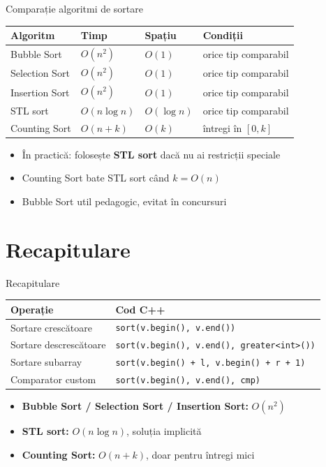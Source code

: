 \documentclass{beamer}
\begin{document}
\begin{frame}{Comparație algoritmi de sortare}
  \begin{center}
  \begin{tabular}{llll}
    \toprule
    Algoritm & Timp & Spațiu & Condiții \\
    \midrule
    Bubble Sort    & $O(n^2)$      & $O(1)$      & orice tip comparabil \\
    Selection Sort & $O(n^2)$      & $O(1)$      & orice tip comparabil \\
    Insertion Sort & $O(n^2)$      & $O(1)$      & orice tip comparabil \\
    STL sort       & $O(n \log n)$ & $O(\log n)$ & orice tip comparabil \\
    Counting Sort  & $O(n + k)$    & $O(k)$      & întregi în $[0, k]$ \\
    \bottomrule
  \end{tabular}
  \end{center}
  \bigskip
  \begin{itemize}
    \item În practică: folosește \textbf{STL sort} dacă nu ai restricții speciale
    \item Counting Sort bate STL sort când $k = O(n)$
    \item Bubble Sort \textemdash{} util pedagogic, evitat în concursuri
  \end{itemize}
\end{frame}

\section{Recapitulare}

\begin{frame}[fragile]{Recapitulare}
  \begin{center}
  \begin{tabular}{ll}
    \toprule
    Operație & Cod C++ \\
    \midrule
    Sortare crescătoare    & \lstinline|sort(v.begin(), v.end())| \\
    Sortare descrescătoare & \lstinline|sort(v.begin(), v.end(), greater<int>())| \\
    Sortare subarray       & \lstinline[keepspaces=true]|sort(v.begin() + l, v.begin() + r + 1)| \\
    Comparator custom      & \lstinline|sort(v.begin(), v.end(), cmp)| \\
    \bottomrule
  \end{tabular}
  \end{center}
  \bigskip
  \begin{itemize}
    \item \textbf{Bubble Sort / Selection Sort / Insertion Sort:} $O(n^2)$
    \item \textbf{STL sort:} $O(n \log n)$, soluția implicită
    \item \textbf{Counting Sort:} $O(n+k)$, doar pentru întregi mici
  \end{itemize}
\end{frame}
\end{document}

